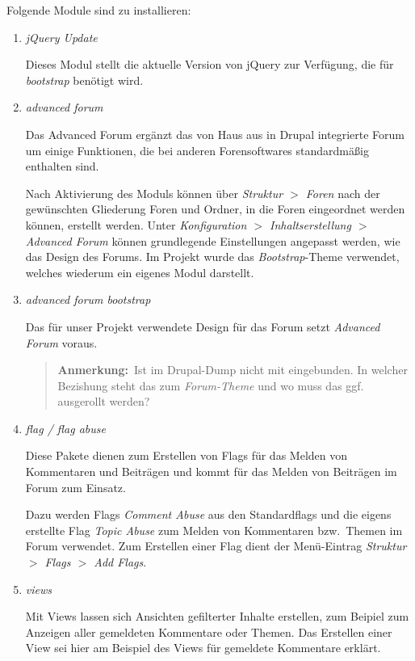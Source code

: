 \documentclass[a4paper,11pt,twoside]{article}
\newcommand{\Anmerkung}[1]{
  \begin{quote} \textbf{Anmerkung:}\ #1 \end{quote}
}
\begin{document}
Folgende Module sind zu installieren: 
\begin{enumerate}

\item \emph{jQuery Update}

Dieses Modul stellt die aktuelle Version von jQuery zur Verfügung, die für
\textit{bootstrap} benötigt wird.

\item \emph{advanced forum}

Das Advanced Forum ergänzt das von Haus aus in Drupal integrierte Forum um
einige Funktionen, die bei anderen Forensoftwares standardmäßig enthalten sind.

Nach Aktivierung des Moduls können über \emph{Struktur $>$ Foren} nach der
gewünschten Gliederung Foren und Ordner, in die Foren eingeordnet werden
können, erstellt werden. Unter \emph{Konfiguration $>$ Inhaltserstellung $>$
  Advanced Forum} können grundlegende Einstellungen angepasst werden, wie das
Design des Forums. Im Projekt wurde das \emph{Bootstrap}-Theme verwendet,
welches wiederum ein eigenes Modul darstellt.

\item \emph{advanced forum bootstrap}

Das für unser Projekt verwendete Design für das Forum setzt \emph{Advanced
  Forum} voraus.

\Anmerkung{Ist im Drupal-Dump nicht mit eingebunden. In welcher Bezishung
  steht das zum \emph{Forum-Theme} und wo muss das ggf. ausgerollt werden? }

\item \emph{flag / flag abuse}

Diese Pakete dienen zum Erstellen von Flags für das Melden von Kommentaren und
Beiträgen und kommt für das Melden von Beiträgen im Forum zum Einsatz.

Dazu werden Flags \textit{Comment Abuse} aus den Standardflags und die eigens
erstellte Flag \textit{Topic Abuse} zum Melden von Kommentaren bzw.\ Themen im
Forum verwendet. Zum Erstellen einer Flag dient der Menü-Eintrag
\textit{Struktur $>$ Flags $>$ Add Flags}.

\item \emph{views}

Mit Views lassen sich Ansichten gefilterter Inhalte erstellen, zum Beipiel zum
Anzeigen aller gemeldeten Kommentare oder Themen. Das Erstellen einer View sei
hier am Beispiel des Views für gemeldete Kommentare erklärt.


\end{enumerate}
\end{document}

